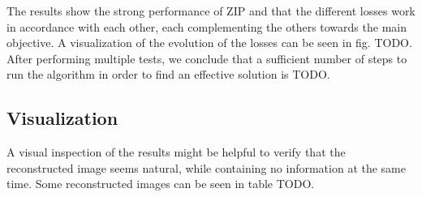 The results show the strong performance of ZIP and that the different losses work in accordance with each other, each complementing the others towards the main objective. A visualization of the evolution of the losses can be seen in fig. TODO. After performing multiple tests, we conclude that a sufficient number of steps to run the algorithm in order to find an effective solution is TODO.


\subsection{Visualization}

A visual inspection of the results might be helpful to verify that the reconstructed image seems natural, while containing no information at the same time. Some reconstructed images can be seen in table TODO. 